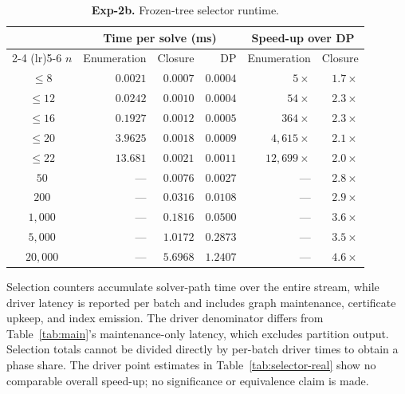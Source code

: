 \begin{table}[tb]\centering
\caption{\textbf{Exp-2b.} Frozen-tree selector runtime.}
\label{tab:selector-exact}
\begin{footnotesize}
\setlength{\tabcolsep}{0.4em}
\begin{tabular*}{\linewidth}{@{\extracolsep{\fill}}crrrrr@{}}
\toprule
& \multicolumn{3}{c}{Time per solve (ms)} & \multicolumn{2}{c}{Speed-up over DP} \\
\cmidrule(lr){2-4} \cmidrule(lr){5-6}
$n$ & Enumeration & Closure & DP & Enumeration & Closure \\
\midrule
$\le 8$  & $0.0021$ & $0.0007$ & $\mathbf{0.0004}$ & $5\times$ & $1.7\times$ \\
$\le 12$ & $0.0242$ & $0.0010$ & $\mathbf{0.0004}$ & $54\times$ & $2.3\times$ \\
$\le 16$ & $0.1927$ & $0.0012$ & $\mathbf{0.0005}$ & $364\times$ & $2.3\times$ \\
$\le 20$ & $3.9625$ & $0.0018$ & $\mathbf{0.0009}$ & $4{,}615\times$ & $2.1\times$ \\
$\le 22$ & $13.681$ & $0.0021$ & $\mathbf{0.0011}$ & $12{,}699\times$ & $2.0\times$ \\
\midrule
$50$      & --- & $0.0076$ & $\mathbf{0.0027}$ & --- & $2.8\times$ \\
$200$     & --- & $0.0316$ & $\mathbf{0.0108}$ & --- & $2.9\times$ \\
$1{,}000$ & --- & $0.1816$ & $\mathbf{0.0500}$ & --- & $3.6\times$ \\
$5{,}000$ & --- & $1.0172$ & $\mathbf{0.2873}$ & --- & $3.5\times$ \\
$20{,}000$& --- & $5.6968$ & $\mathbf{1.2407}$ & --- & $4.6\times$ \\
\bottomrule
\end{tabular*}
\end{footnotesize}
\end{table}

 Selection counters accumulate solver-path time
over the entire stream, while driver latency is reported per batch and
includes graph maintenance, certificate upkeep, and index emission. The
driver denominator differs from Table~\ref{tab:main}'s maintenance-only
latency, which excludes partition output. Selection totals cannot be
divided directly by per-batch driver times to obtain a phase share.
The driver point estimates in Table~\ref{tab:selector-real} show no
comparable overall speed-up; no significance or equivalence claim is made.

